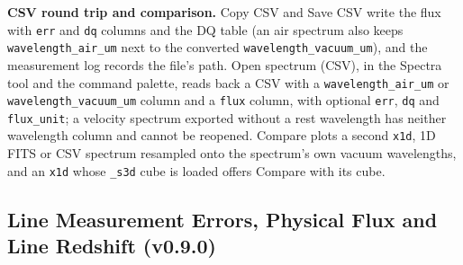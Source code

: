 \documentclass[11pt,a4paper]{article}
\newcommand{\code}[1]{\texttt{\small #1}}
\begin{document}
    \textbf{CSV round trip and comparison.} Copy CSV and Save CSV write the flux with \code{err} and \code{dq} columns and the DQ table (an air spectrum also keeps \code{wavelength\_air\_um} next to the converted \code{wavelength\_vacuum\_um}), and the measurement log records the file's path. Open spectrum (CSV), in the Spectra tool and the command palette, reads back a CSV with a \code{wavelength\_air\_um} or \code{wavelength\_vacuum\_um} column and a \code{flux} column, with optional \code{err}, \code{dq} and \code{flux\_unit}; a velocity spectrum exported without a rest wavelength has neither wavelength column and cannot be reopened. Compare plots a second \code{x1d}, 1D FITS or CSV spectrum resampled onto the spectrum's own vacuum wavelengths, and an \code{x1d} whose \code{\_s3d} cube is loaded offers Compare with its cube.

    \subsection{Line Measurement Errors, Physical Flux and Line Redshift (v0.9.0)}
    \label{sec:line_090}
\end{document}
